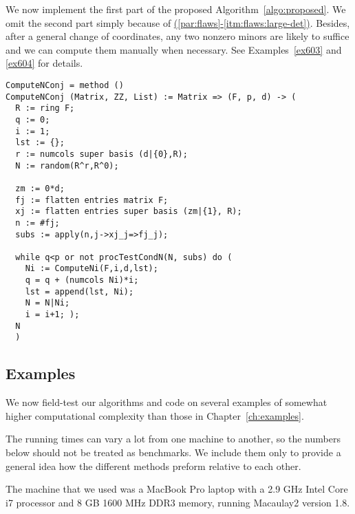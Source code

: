 \documentclass[fleqn,reqno]{amsart}
\renewcommand{\itmref}[2]{{\normalfont\hyperref[#1]{(\ref*{#2}-\ref*{#1})}}}
\begin{document}
\begin{paragraf}
\label{code:algo:proposed}
We now implement the first part of the proposed Algorithm~\ref{algo:proposed}.
We omit the second part simply because of \itmref{itm:flaws:large-det}{par:flaws}.
Besides, after a general change of coordinates,
any two nonzero minors are likely to suffice and we can compute them manually when necessary.
See Examples~\ref{ex603} and \ref{ex604} for details.
\begin{verbatim}
ComputeNConj = method ()
ComputeNConj (Matrix, ZZ, List) := Matrix => (F, p, d) -> (
  R := ring F;
  q := 0;
  i := 1;
  lst := {};
  r := numcols super basis (d|{0},R);
  N := random(R^r,R^0);
  
  zm := 0*d;
  fj := flatten entries matrix F;
  xj := flatten entries super basis (zm|{1}, R);
  n := #fj;
  subs := apply(n,j->xj_j=>fj_j);
  
  while q<p or not procTestCondN(N, subs) do (
    Ni := ComputeNi(F,i,d,lst);
    q = q + (numcols Ni)*i;
    lst = append(lst, Ni);
    N = N|Ni;
    i = i+1; );
  N
  )
\end{verbatim}
\end{paragraf}

\subsection{Examples}
\label{sec:long-examples}

\begin{paragraf*}
We now field-test our algorithms and code on several examples of
somewhat higher computational complexity than those in Chapter~\ref{ch:examples}.

The running times can vary a lot from one machine to another,
so the numbers below should not be treated as benchmarks.
We include them only to provide a general idea how the different methods preform
relative to each other.

The machine that we used was a MacBook Pro laptop with
a 2.9 GHz Intel Core i7 processor and 8 GB 1600 MHz DDR3 memory,
running Macaulay2 version 1.8.
\end{paragraf*}
\end{document}
